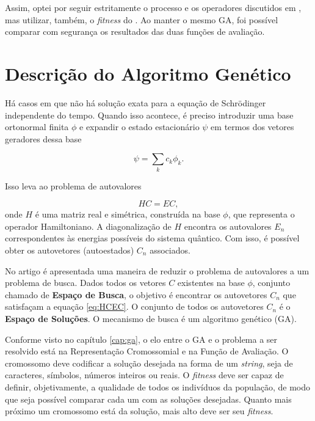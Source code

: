 	Assim, optei por seguir estritamente o processo e os operadores discutidos em \cite{metodo2004}, mas utilizar, também, o \emph{fitness} do \cite{metodo2011}. Ao manter o mesmo GA, foi possível comparar com segurança os resultados das duas funções de avaliação.

\section{Descrição do Algoritmo Genético}

	Há casos em que não há solução exata para a equação de Schrödinger independente do tempo. Quando isso acontece, é preciso introduzir uma base ortonormal finita {$\phi$} e expandir o estado estacionário $\psi$ em termos dos vetores geradores dessa base
	
	\begin{equation}
		\psi = \sum_k c_k \phi_k.
	\end{equation}
	
	Isso leva ao problema de autovalores
	
	\begin{equation}\label{eq:HCEC}
		HC = EC,
	\end{equation}
	onde $H$ é uma matriz real e simétrica, construída na base ${\phi}$, que representa o operador Hamiltoniano. A diagonalização de $H$ encontra os autovalores $E_n$ correspondentes às energias possíveis do sistema quântico. Com isso, é possível obter os autovetores (autoestados) $C_n$ associados.
	
	No artigo \cite{metodo2004} é apresentada uma maneira de reduzir o problema de autovalores a um problema de busca. Dados todos os vetores $C$ existentes na base $\phi$, conjunto chamado de \textbf{Espaço de Busca}, o objetivo é encontrar os autovetores $C_n$ que satisfaçam a equação \ref{eq:HCEC}. O conjunto de todos os autovetores $C_n$ é o \textbf{Espaço de Soluções}. O mecanismo de busca é um algoritmo genético (GA).
	
	Conforme visto no capítulo \ref{cap:ga}, o elo entre o GA e o problema a ser resolvido está na Representação Cromossomial e na Função de Avaliação. O cromossomo deve codificar a solução desejada na forma de um \emph{string}, seja de caracteres, símbolos, números inteiros ou reais. O \emph{fitness} deve ser capaz de definir, objetivamente, a qualidade de todos os indivíduos da população, de modo que seja possível comparar cada um com as soluções desejadas. Quanto mais próximo um cromossomo está da solução, mais alto deve ser seu \emph{fitness}.

